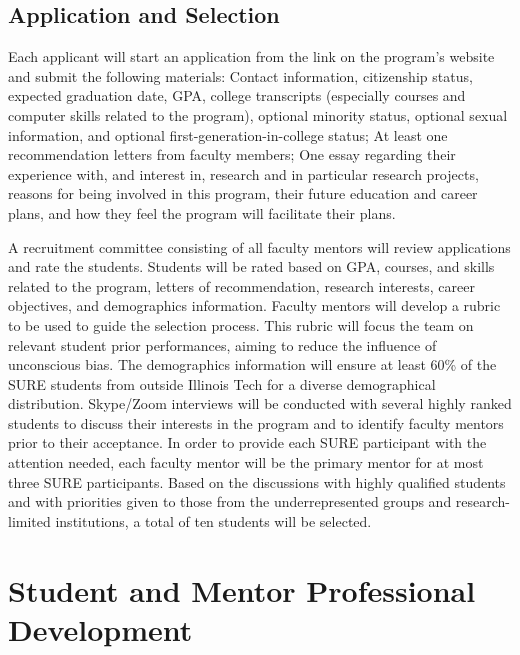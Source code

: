 \documentclass[11pt]{NSFamsart}
\begin{document}
\subsection{Application and Selection} Each applicant will start an application from the link on the program’s
website and submit the following materials: 
Contact information, citizenship status, expected graduation date, GPA, college transcripts (especially courses and computer skills related to the program),
optional minority status, optional sexual information, and optional first-generation-in-college status;
At least one recommendation
letters from faculty members; 
One essay regarding their experience with, and interest in, research and in particular research projects, reasons for being involved in this program, their future
education and career plans, and how they feel the program will facilitate their plans. 

A recruitment committee consisting of all faculty mentors will review applications and rate the students. Students
will be rated based on GPA, courses, and skills related to the program, letters of recommendation,
research interests, career objectives, and demographics information. Faculty mentors
will develop a rubric to be used to guide the selection
process. This rubric will focus the team on relevant student prior performances, aiming to reduce the
influence of unconscious bias. The demographics information will ensure at least 60\% of the SURE students
from outside Illinois Tech for a diverse demographical distribution. Skype/Zoom interviews will be conducted
with several highly ranked students to discuss their interests in the program and to identify faculty
mentors prior to their acceptance. In order to provide each SURE participant with the attention needed,
each faculty mentor will be the primary mentor for at most three SURE participants. Based on the
discussions with highly qualified students and with priorities given to those from the underrepresented
groups and research-limited institutions, a total of ten students will be selected.

\section{Student and Mentor Professional Development}
\end{document}
